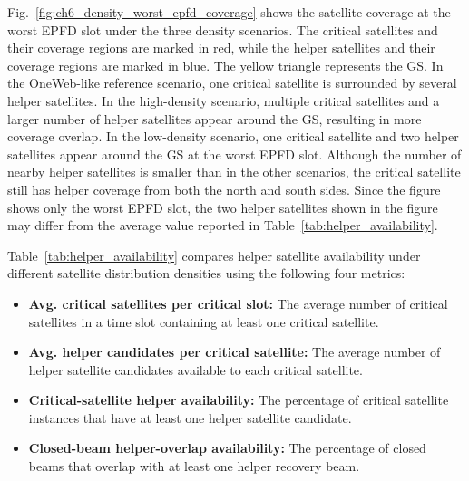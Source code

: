 Fig.~\ref{fig:ch6_density_worst_epfd_coverage} shows the satellite coverage at the worst EPFD slot under the three density scenarios. The critical satellites and their coverage regions are marked in red, while the helper satellites and their coverage regions are marked in blue. The yellow triangle represents the GS. In the OneWeb-like reference scenario, one critical satellite is surrounded by several helper satellites. In the high-density scenario, multiple critical satellites and a larger number of helper satellites appear around the GS, resulting in more coverage overlap. In the low-density scenario, one critical satellite and two helper satellites appear around the GS at the worst EPFD slot. Although the number of nearby helper satellites is smaller than in the other scenarios, the critical satellite still has helper coverage from both the north and south sides. Since the figure shows only the worst EPFD slot, the two helper satellites shown in the figure may differ from the average value reported in Table~\ref{tab:helper_availability}.

Table~\ref{tab:helper_availability} compares helper satellite availability under different satellite distribution densities using the following four metrics:
\begin{itemize}[leftmargin=*,nosep]
  \item \textbf{Avg. critical satellites per critical slot:}
  The average number of critical satellites in a time slot containing at least one critical satellite.
  \item \textbf{Avg. helper candidates per critical satellite:}
  The average number of helper satellite candidates available to each critical satellite.
  \item \textbf{Critical-satellite helper availability:}
  The percentage of critical satellite instances that have at least one helper satellite candidate.
  \item \textbf{Closed-beam helper-overlap availability:}
  The percentage of closed beams that overlap with at least one helper recovery beam.
\end{itemize}


